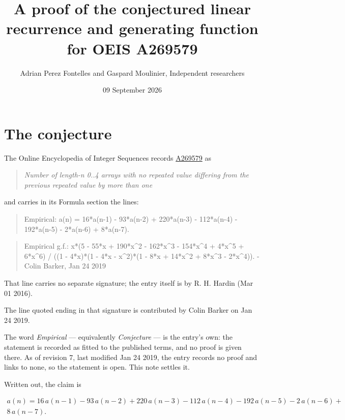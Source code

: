 \documentclass[11pt]{article}
\title{A proof of the conjectured linear recurrence and generating function for OEIS A269579}
\author{Adrian Perez Fontelles and Gaspard Moulinier, Independent researchers}
\date{09 September 2026}
\theoremstyle{definition}
\begin{document}
\maketitle
\section{The conjecture}

The Online Encyclopedia of Integer Sequences records \href{https://oeis.org/A269579}{A269579} as

\begin{quote}\itshape Number of length-n 0..4 arrays with no repeated value differing from the previous repeated value by more than one\end{quote}

and carries in its Formula section the lines:

\begin{quote}\ttfamily Empirical: a(n) = 16*a(n-1) - 93*a(n-2) + 220*a(n-3) - 112*a(n-4) - 192*a(n-5) - 2*a(n-6) + 8*a(n-7).\end{quote}

\begin{quote}\ttfamily Empirical g.f.: x*(5 - 55*x + 190*x\textasciicircum{}2 - 162*x\textasciicircum{}3 - 154*x\textasciicircum{}4 + 4*x\textasciicircum{}5 + 6*x\textasciicircum{}6) / ((1 - 4*x)*(1 - 4*x - x\textasciicircum{}2)*(1 - 8*x + 14*x\textasciicircum{}2 + 8*x\textasciicircum{}3 - 2*x\textasciicircum{}4)). - Colin Barker, Jan 24 2019\end{quote}

That line carries no separate signature; the entry itself is by R. H. Hardin (Mar 01 2016).

The line quoted ending in that signature is contributed by Colin Barker on Jan 24 2019.

The word {\itshape Empirical} --- equivalently {\itshape Conjecture} --- is the entry's own: the statement is recorded as fitted to the published terms, and no proof is given there. As of revision 7, last modified Jan 24 2019, the entry records no proof and links to none, so the statement is open. This note settles it.

Written out, the claim is

\begin{multline*} a(n) = 16\,a(n-1) - 93\,a(n-2) + 220\,a(n-3) - 112\,a(n-4) - 192\,a(n-5) - 2\,a(n-6) + \\ 8\,a(n-7). \end{multline*}
\end{document}
